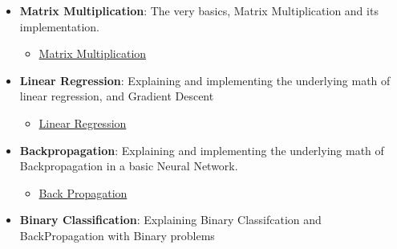\documentclass{article}
\begin{document}
\begin{itemize}
    \item \textbf{Matrix Multiplication}: The very basics, Matrix Multiplication and its implementation.
    \begin{itemize}
        \item \href{/notebooks/StartingFromTheBasicsMatrixMultiplication.ipynb}{Matrix Multiplication}
    \end{itemize}
        \item \textbf{Linear Regression}: Explaining and implementing the underlying math of linear regression, and Gradient Descent
    \begin{itemize}
        \item \href{/notebooks/StartingFromTheBasicsLinearRegression.ipynb}{Linear Regression}
    \end{itemize}
    \item \textbf{Backpropagation}: Explaining and implementing the underlying math of Backpropagation in a basic Neural Network.
    \begin{itemize}
        \item \href{/notebooks/StartingFromTheBasicsBackPropagation.ipynb}{Back Propagation}
    \end{itemize}
    \item \textbf{Binary Classification}: Explaining Binary Classifcation and BackPropagation with Binary problems
\end{itemize}
\end{document}
